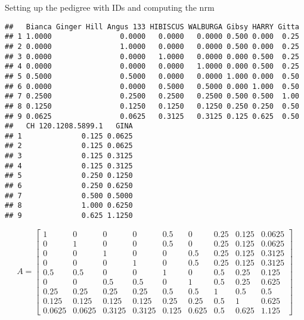 \documentclass[
]{article}
\newenvironment{Shaded}{\begin{snugshade}}{\end{snugshade}}
\newcommand{\AttributeTok}[1]{\textcolor[rgb]{0.77,0.63,0.00}{#1}}
\newcommand{\DecValTok}[1]{\textcolor[rgb]{0.00,0.00,0.81}{#1}}
\newcommand{\FunctionTok}[1]{\textcolor[rgb]{0.00,0.00,0.00}{#1}}
\newcommand{\NormalTok}[1]{#1}
\newcommand{\OtherTok}[1]{\textcolor[rgb]{0.56,0.35,0.01}{#1}}
\newcommand{\SpecialCharTok}[1]{\textcolor[rgb]{0.00,0.00,0.00}{#1}}
\begin{document}
Setting up the pedigree with IDs and computing the nrm

\begin{Shaded}
\end{Shaded}

\begin{verbatim}
##   Bianca Ginger Hill Angus 133 HIBISCUS WALBURGA Gibsy HARRY Gitta
## 1 1.0000                0.0000   0.0000   0.0000 0.500 0.000  0.25
## 2 0.0000                1.0000   0.0000   0.0000 0.500 0.000  0.25
## 3 0.0000                0.0000   1.0000   0.0000 0.000 0.500  0.25
## 4 0.0000                0.0000   0.0000   1.0000 0.000 0.500  0.25
## 5 0.5000                0.5000   0.0000   0.0000 1.000 0.000  0.50
## 6 0.0000                0.0000   0.5000   0.5000 0.000 1.000  0.50
## 7 0.2500                0.2500   0.2500   0.2500 0.500 0.500  1.00
## 8 0.1250                0.1250   0.1250   0.1250 0.250 0.250  0.50
## 9 0.0625                0.0625   0.3125   0.3125 0.125 0.625  0.50
##   CH 120.1208.5899.1   GINA
## 1              0.125 0.0625
## 2              0.125 0.0625
## 3              0.125 0.3125
## 4              0.125 0.3125
## 5              0.250 0.1250
## 6              0.250 0.6250
## 7              0.500 0.5000
## 8              1.000 0.6250
## 9              0.625 1.1250
\end{verbatim}

\[A = \begin{bmatrix} 1 & 0 & 0 & 0 & 0.5 & 0 & 0.25 & 0.125 & 0.0625 \\0 & 1 & 0 & 0 & 0.5 & 0 & 0.25 & 0.125 & 0.0625 \\0 & 0 & 1 & 0 & 0 & 0.5 & 0.25 & 0.125 & 0.3125 \\0 & 0 & 0 & 1 & 0 & 0.5 & 0.25 & 0.125 & 0.3125 \\0.5 & 0.5 & 0 & 0 & 1 & 0 & 0.5 & 0.25 & 0.125 \\0 & 0 & 0.5 & 0.5 & 0 & 1 & 0.5 & 0.25 & 0.625 \\0.25 & 0.25 & 0.25 & 0.25 & 0.5 & 0.5 & 1 & 0.5 & 0.5 \\0.125 & 0.125 & 0.125 & 0.125 & 0.25 & 0.25 & 0.5 & 1 & 0.625 \\0.0625 & 0.0625 & 0.3125 & 0.3125 & 0.125 & 0.625 & 0.5 & 0.625 & 1.125\end{bmatrix}\]
\end{document}
